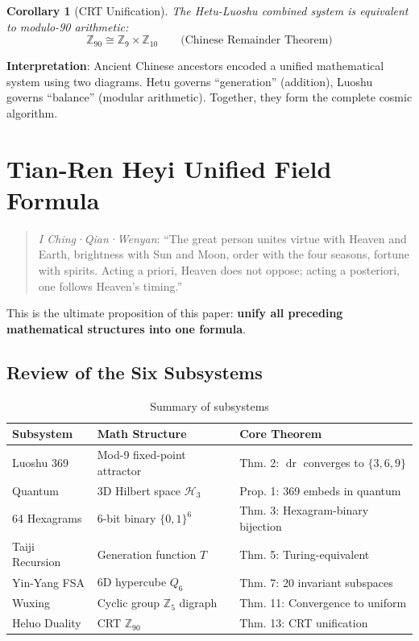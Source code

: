 \documentclass[conference]{IEEEtran}
\newtheorem{corollary}[theorem]{Corollary}
\theoremstyle{remark}
\newcommand{\Z}{\mathbb{Z}}
\newcommand{\dr}{\operatorname{dr}}
\begin{document}
\begin{corollary}[CRT Unification]
The Hetu-Luoshu combined system is equivalent to modulo-90 arithmetic:
\[
\Z_{90} \cong \Z_9 \times \Z_{10} \qquad\text{(Chinese Remainder Theorem)}
\]
\end{corollary}

\textbf{Interpretation}: Ancient Chinese ancestors encoded a unified mathematical system using two diagrams. Hetu governs ``generation'' (addition), Luoshu governs ``balance'' (modular arithmetic). Together, they form the complete cosmic algorithm.

\section{Tian-Ren Heyi Unified Field Formula}

\begin{quote}
\emph{I Ching·Qian·Wenyan}: ``The great person unites virtue with Heaven and Earth, brightness with Sun and Moon, order with the four seasons, fortune with spirits. Acting a priori, Heaven does not oppose; acting a posteriori, one follows Heaven's timing.''
\end{quote}

This is the ultimate proposition of this paper: \textbf{unify all preceding mathematical structures into one formula}.

\subsection{Review of the Six Subsystems}

\begin{table}[h]
\centering
\caption{Summary of subsystems}
\label{tab:subsystems}
\begin{tabular}{p{2cm}p{2.5cm}p{2.5cm}}
\toprule
Subsystem & Math Structure & Core Theorem \\
\midrule
Luoshu 369 & Mod-9 fixed-point attractor & Thm. 2: $\dr$ converges to $\{3,6,9\}$ \\
Quantum & 3D Hilbert space $\mathcal{H}_3$ & Prop. 1: 369 embeds in quantum \\
64 Hexagrams & 6-bit binary $\{0,1\}^6$ & Thm. 3: Hexagram-binary bijection \\
Taiji Recursion & Generation function $T$ & Thm. 5: Turing-equivalent \\
Yin-Yang FSA & 6D hypercube $Q_6$ & Thm. 7: 20 invariant subspaces \\
Wuxing & Cyclic group $\Z_5$ digraph & Thm. 11: Convergence to uniform \\
Heluo Duality & CRT $\Z_{90}$ & Thm. 13: CRT unification \\
\bottomrule
\end{tabular}
\end{table}
\end{document}
